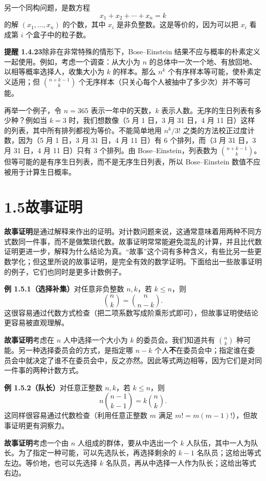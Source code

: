 \documentclass[UTF8,12pt,a4paper,fontset=fandol]{ctexart}
\begin{document}
另一个同构问题，是数方程
\[
  x_1+x_2+\cdots+x_n=k
\]
的解 $(x_1,\ldots,x_n)$ 的个数，其中 $x_i$ 是非负整数。这是等价的，因为可以把 $x_i$ 看成第 $i$ 个盒子中的粒子数。

\noindent\textbf{提醒 1.4.23}\quad 除非在非常特殊的情形下，Bose--Einstein 结果不应与概率的朴素定义一起使用。例如，考虑一个调查：从大小为 $n$ 的总体中一次一个地、有放回地、以相等概率选择人，收集大小为 $k$ 的样本。那么 $n^k$ 个有序样本等可能，使朴素定义适用；但 $\binom{n+k-1}{k}$ 个无序样本（只关心每个人被抽中了多少次）并不等可能。

再举一个例子，令 $n=365$ 表示一年中的天数，$k$ 表示人数。无序的生日列表有多少种？例如当 $k=3$ 时，我们想数像（5 月 1 日，3 月 31 日，4 月 11 日）这样的列表，其中所有排列都视为等价。不能简单地用 $n^k/3!$ 之类的方法校正过度计数，因为（5 月 1 日，3 月 31 日，4 月 11 日）有 6 个排列，而（3 月 31 日，3 月 31 日，4 月 11 日）只有 3 个排列。由 Bose--Einstein，列表数为 $\binom{n+k-1}{k}$。但等可能的是有序生日列表，而不是无序生日列表，所以 Bose--Einstein 数值不应被用于计算生日概率。

\section*{1.5\quad 故事证明}

\textbf{故事证明}是通过解释来作出的证明。对计数问题来说，这通常意味着用两种不同方式数同一件事，而不是做繁琐代数。故事证明常常能避免混乱的计算，并且比代数证明更进一步，解释为什么结论为真。“故事”这个词有多种含义，有些比另一些更数学化；但这里所说的故事证明，是完全有效的数学证明。下面给出一些故事证明的例子，它们也同时是更多计数例子。

\noindent\textbf{例 1.5.1（选择补集）}\quad 对任意非负整数 $n,k$，若 $k\le n$，则
\[
  \binom{n}{k}=\binom{n}{n-k}.
\]
这很容易通过代数方式检查（把二项系数写成阶乘形式即可），但故事证明使结论更容易被直观理解。

\noindent\textbf{故事证明}\quad 考虑在 $n$ 人中选择一个大小为 $k$ 的委员会。我们知道共有 $\binom{n}{k}$ 种可能。另一种选择委员会的方式，是指定哪 $n-k$ 个人\textbf{不}在委员会中；指定谁在委员会中就决定了谁不在委员会中，反之亦然。因此等式两边相等，因为它们是对同一件事的两种计数方式。

\noindent\textbf{例 1.5.2（队长）}\quad 对任意正整数 $n,k$，若 $k\le n$，则
\[
  n\binom{n-1}{k-1}=k\binom{n}{k}.
\]
这同样很容易通过代数检查（利用任意正整数 $m$ 满足 $m!=m(m-1)!$），但故事证明更有洞察力。

\noindent\textbf{故事证明}\quad 考虑一个由 $n$ 人组成的群体，要从中选出一个 $k$ 人队伍，其中一人为队长。为了指定一种可能，可以先选队长，再选择剩余的 $k-1$ 名队员；这给出等式左边。等价地，也可以先选择 $k$ 名队员，再从中选择一人作为队长；这给出等式右边。
\end{document}
